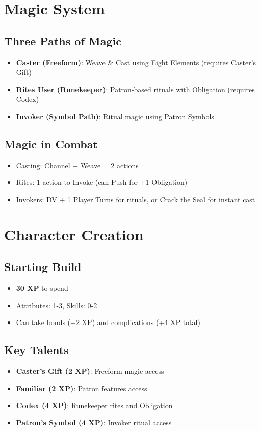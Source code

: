 \documentclass[11pt]{article}
\begin{document}
\section{Magic System}

\subsection{Three Paths of Magic}
\begin{itemize}
    \item \textbf{Caster (Freeform)}: Weave \& Cast using Eight Elements (requires Caster's Gift)
    \item \textbf{Rites User (Runekeeper)}: Patron-based rituals with Obligation (requires Codex)
    \item \textbf{Invoker (Symbol Path)}: Ritual magic using Patron Symbols
\end{itemize}

\subsection{Magic in Combat}
\begin{itemize}
    \item Casting: Channel + Weave = 2 actions
    \item Rites: 1 action to Invoke (can Push for +1 Obligation)
    \item Invokers: DV + 1 Player Turns for rituals, or Crack the Seal for instant cast
\end{itemize}

\section{Character Creation}

\subsection{Starting Build}
\begin{itemize}
    \item \textbf{30 XP} to spend
    \item Attributes: 1-3, Skills: 0-2
    \item Can take bonds (+2 XP) and complications (+4 XP total)
\end{itemize}

\subsection{Key Talents}
\begin{itemize}
    \item \textbf{Caster's Gift (2 XP)}: Freeform magic access
    \item \textbf{Familiar (2 XP)}: Patron features access
    \item \textbf{Codex (4 XP)}: Runekeeper rites and Obligation
    \item \textbf{Patron's Symbol (4 XP)}: Invoker ritual access
\end{itemize}
\end{document}
